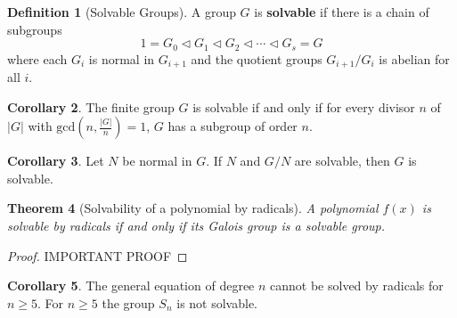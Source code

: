 \documentclass[10pt, oneside, reqno]{amsart}
\theoremstyle{plain}%
\newtheorem{thm}{Theorem}[section]
\theoremstyle{definition}
\newtheorem{defn}[thm]{Definition}
\newtheorem{cor}[thm]{Corollary}
\theoremstyle{remark}
\begin{document}
\begin{defn}[Solvable Groups]
    A group $G$ is \textbf{solvable} if there is a chain of subgroups\[
        1 = G_0 \lhd G_1 \lhd G_2 \lhd \cdots \lhd G_s = G
    \] where each $G_i$ is normal in $G_{i+1}$ and the quotient groups $G_{i+1}/G_i$ is abelian for all $i$.
\end{defn}

\begin{cor}
    The finite group $G$ is solvable if and only if for every divisor $n$ of $|G|$ with $\text{gcd}(n, \frac{|G|}{n}) = 1$, $G$ has a subgroup of order $n$.
\end{cor}

\begin{cor} Let $N$ be normal in $G$.
    If $N$ and $G/N$ are solvable, then $G$ is solvable.
\end{cor}

\begin{thm}[Solvability of a polynomial by radicals]
    A polynomial $f(x)$ is solvable by radicals if and only if its Galois group is a solvable group.
\end{thm}

\begin{proof}
    IMPORTANT PROOF
\end{proof}

\begin{cor}
    The general equation of degree $n$ cannot be solved by radicals for $n \geq 5$.  For $n \geq 5$ the group $S_n$ is not solvable.
\end{cor}
\end{document}
